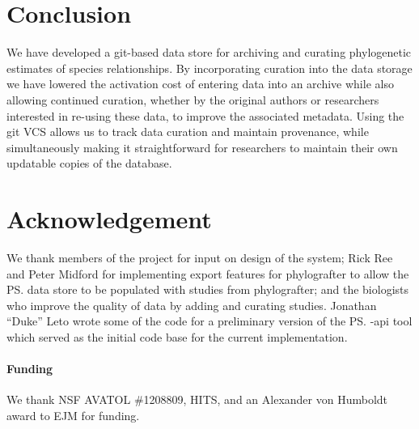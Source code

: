 \section{Conclusion}
We have developed a git-based data store for archiving and curating phylogenetic estimates of species relationships.
By incorporating curation into the data storage we have lowered the activation cost of entering data into
    an archive while also allowing continued curation, whether by the original authors or researchers
    interested in re-using these data, to improve the associated metadata.
Using the git VCS allows us to track data curation and maintain provenance, while simultaneously making it straightforward
    for researchers to maintain their own updatable copies of the database.

\section*{Acknowledgement}
We thank members of the \otol project for input on design of the system;
Rick Ree and Peter Midford for implementing export features for phylografter to allow the \ps
    data store to be populated with studies from phylografter; and 
the biologists who improve the quality of data by adding and curating studies.
Jonathan ``Duke'' Leto wrote some of the code for a preliminary version of the \ps-api tool
    which served as the initial code base for the current implementation.
\paragraph{Funding\textcolon} We thank NSF AVATOL \#1208809, HITS, and an Alexander von Humboldt award to EJM for funding.





